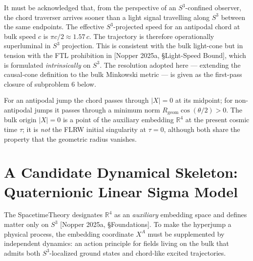 \documentclass[11pt,a4paper]{article}
\newcommand{\Rgeom}{R_{\mathrm{geom}}}
\begin{document}
It must be acknowledged that, from the perspective of an $S^3$-confined observer, the chord traverser arrives sooner than a light signal travelling along $S^3$ between the same endpoints. The effective $S^3$-projected speed for an antipodal chord at bulk speed $c$ is $\pi c / 2 \approx 1.57\,c$. The trajectory is therefore operationally superluminal in $S^3$ projection. This is consistent with the bulk light-cone but in tension with the FTL prohibition in [Nopper 2025a, \S Light-Speed Bound], which is formulated \emph{intrinsically} on $S^3$. The resolution adopted here --- extending the causal-cone definition to the bulk Minkowski metric --- is given as the first-pass closure of subproblem 6 below.

For an antipodal jump the chord passes through $\lvert X\rvert = 0$ at its midpoint; for non-antipodal jumps it passes through a minimum norm $\Rgeom\cos(\theta/2) > 0$. The bulk origin $\lvert X\rvert = 0$ is a point of the auxiliary embedding $\mathbb{R}^4$ at the present cosmic time $\tau$; it is \emph{not} the FLRW initial singularity at $\tau = 0$, although both share the property that the geometric radius vanishes.

\section{A Candidate Dynamical Skeleton: Quaternionic Linear Sigma Model}
\label{sec:sigma}

The SpacetimeTheory designates $\mathbb{R}^4$ as an \emph{auxiliary} embedding space and defines matter only on $S^3$ [Nopper 2025a, \S Foundations]. To make the hyperjump a physical process, the embedding coordinate $X^A$ must be supplemented by independent dynamics: an action principle for fields living on the bulk that admits both $S^3$-localized ground states and chord-like excited trajectories.
\end{document}
